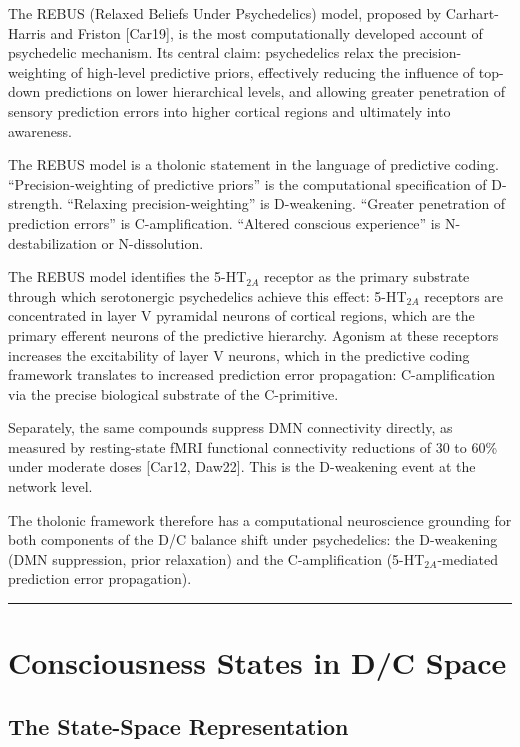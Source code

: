 \documentclass[12pt]{article}
\begin{document}
The REBUS (Relaxed Beliefs Under Psychedelics) model, proposed by
Carhart-Harris and Friston {[}Car19{]}, is the most computationally
developed account of psychedelic mechanism. Its central claim:
psychedelics relax the precision-weighting of high-level predictive
priors, effectively reducing the influence of top-down predictions on
lower hierarchical levels, and allowing greater penetration of sensory
prediction errors into higher cortical regions and ultimately into
awareness.

The REBUS model is a tholonic statement in the language of predictive
coding. ``Precision-weighting of predictive priors'' is the
computational specification of D-strength. ``Relaxing
precision-weighting'' is D-weakening. ``Greater penetration of
prediction errors'' is C-amplification. ``Altered conscious experience''
is N-destabilization or N-dissolution.

The REBUS model identifies the 5-HT\(_{2A}\) receptor as the primary
substrate through which serotonergic psychedelics achieve this effect:
5-HT\(_{2A}\) receptors are concentrated in layer V pyramidal neurons of
cortical regions, which are the primary efferent neurons of the
predictive hierarchy. Agonism at these receptors increases the
excitability of layer V neurons, which in the predictive coding
framework translates to increased prediction error propagation:
C-amplification via the precise biological substrate of the C-primitive.

Separately, the same compounds suppress DMN connectivity directly, as
measured by resting-state fMRI functional connectivity reductions of 30
to 60\% under moderate doses {[}Car12, Daw22{]}. This is the D-weakening
event at the network level.

The tholonic framework therefore has a computational neuroscience
grounding for both components of the D/C balance shift under
psychedelics: the D-weakening (DMN suppression, prior relaxation) and
the C-amplification (5-HT\(_{2A}\)-mediated prediction error
propagation).

\begin{center}\rule{0.5\linewidth}{0.5pt}\end{center}

\section{Consciousness States in D/C Space}\label{consciousness-states-in-dc-space}

\subsection{The State-Space Representation}\label{the-state-space-representation}
\end{document}
